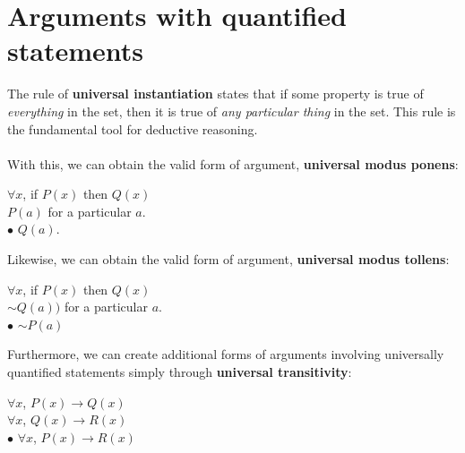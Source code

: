 \documentclass[a4paper]{article}
\begin{document}
\section{Arguments with quantified statements}
The rule of \textbf{universal instantiation} states that if some property is true of \textit{everything} in the set, then it is true of \textit{any particular thing} in the set.
This rule is the fundamental tool for deductive reasoning.\\ \\
With this, we can obtain the valid form of argument, \textbf{universal modus ponens}:
\begin{center}
	$\forall x$, if $P(x)$ then $Q(x)$\\
	$P(a)$ for a particular $a$.\\
	$\bullet$ $Q(a)$.
\end{center}
Likewise, we can obtain the valid form of argument, \textbf{universal modus tollens}:
\begin{center}
	$\forall x$, if $P(x)$ then $Q(x)$\\
	$\sim Q(a))$ for a particular $a$.\\
	$\bullet$ $\sim P(a)$
\end{center}
Furthermore, we can create additional forms of arguments involving universally quantified statements simply through \textbf{universal transitivity}:
\begin{center}
	$\forall x$, $P(x) \rightarrow Q(x)$\\
	$\forall x$, $Q(x) \rightarrow R(x)$\\
	$\bullet$ 	$\forall x$, $P(x) \rightarrow R(x)$\\
\end{center}
\end{document}
